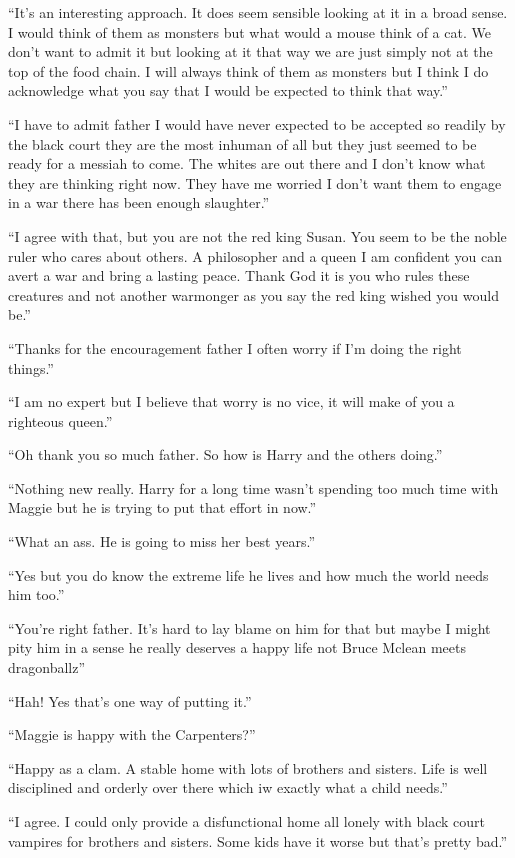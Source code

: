 ``It's an interesting approach. It does seem sensible looking at it in a broad sense. I would think of them as monsters but what would a mouse think of a cat. We don't want to admit it but looking at it that way we are just simply not at the top of the food chain. I will always think of them as monsters but I think I do acknowledge what you say that I would be expected to think that way.''

``I have to admit father I would have never expected to be accepted so readily by the black court they are the most inhuman of all but they just seemed to be ready for a messiah to come. The whites are out there and I don't know what they are thinking right now. They have me worried I don't want them to engage in a war there has been enough slaughter.''

``I agree with that, but you are not the red king Susan. You seem to be the noble ruler who cares about others. A philosopher and a queen I am confident you can avert a war and bring a lasting peace. Thank God it is you who rules these creatures and not another warmonger as you say the red king wished you would be.''

``Thanks for the encouragement father I often worry if I'm doing the right things.''

``I am no expert but I believe that worry is no vice, it will make of you a righteous queen.''

``Oh thank you so much father. So how is Harry and the others doing.''

``Nothing new really. Harry for a long time wasn't spending too much time with Maggie but he is trying to put that effort in now.''

``What an ass. He is going to miss her best years.''

``Yes but you do know the extreme life he lives and how much the world needs him too.''

``You're right father. It's hard to lay blame on him for that but maybe I might pity him in a sense he really deserves a happy life not Bruce Mclean meets dragonballz''

``Hah! Yes that's one way of putting it.''

``Maggie is happy with the Carpenters?''

``Happy as a clam. A stable home with lots of brothers and sisters. Life is well disciplined and orderly over there which iw exactly what a child needs.''

``I agree. I could only provide a disfunctional home all lonely with black court vampires for brothers and sisters. Some kids have it worse but that's pretty bad.''

